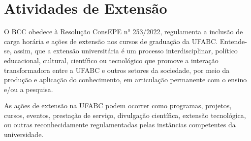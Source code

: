 \section{Atividades de Extensão}
\label{sec:extensao}

O BCC obedece à Resolução ConsEPE n° 253/2022, regulamenta a inclusão de carga horária e ações de extensão nos cursos de graduação da UFABC. Entende-se, assim, que a extensão universitária é um processo interdisciplinar, político educacional, cultural, científico ou tecnológico que promove a interação transformadora entre a UFABC e outros setores da sociedade, por meio da produção e aplicação do conhecimento, em articulação permanente com o ensino e/ou a pesquisa.

As ações de extensão na UFABC podem ocorrer como programas, projetos, cursos, eventos, prestação de serviço, divulgação científica, extensão tecnológica, ou outras reconhecidamente regulamentadas pelas instâncias competentes da universidade. 

